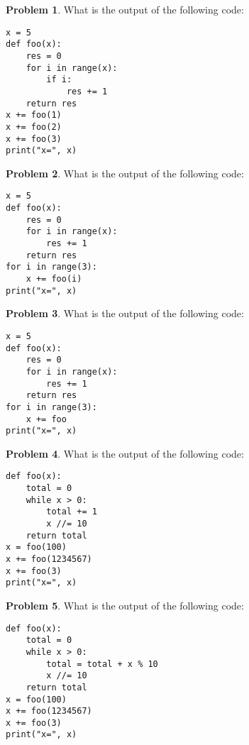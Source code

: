 \documentclass[10pt]{article}
\theoremstyle{definition}
\newtheorem{problem}{Problem}
\begin{document}
\newpage
\begin{problem}
    What is the output of the following code:
\end{problem}
\begin{lstlisting}
x = 5
def foo(x):
    res = 0
    for i in range(x):
        if i:
            res += 1
    return res
x += foo(1)
x += foo(2)
x += foo(3)
print("x=", x)
\end{lstlisting}
\vspace{2in}


\begin{problem}
    What is the output of the following code:
\end{problem}
\begin{lstlisting}
x = 5
def foo(x):
    res = 0
    for i in range(x):
        res += 1
    return res
for i in range(3):
    x += foo(i)
print("x=", x)
\end{lstlisting}
\vspace{2in}


\newpage
\begin{problem}
    What is the output of the following code:
\end{problem}
\begin{lstlisting}
x = 5
def foo(x):
    res = 0
    for i in range(x):
        res += 1
    return res
for i in range(3):
    x += foo
print("x=", x)
\end{lstlisting}
\vspace{2in}


\begin{problem}
    What is the output of the following code:
\end{problem}
\begin{lstlisting}
def foo(x):
    total = 0
    while x > 0:
        total += 1
        x //= 10
    return total
x = foo(100)
x += foo(1234567)
x += foo(3)
print("x=", x)
\end{lstlisting}
\vspace{2in}

\newpage
\begin{problem}
    What is the output of the following code:
\end{problem}
\begin{lstlisting}
def foo(x):
    total = 0
    while x > 0:
        total = total + x % 10
        x //= 10
    return total
x = foo(100)
x += foo(1234567)
x += foo(3)
print("x=", x)
\end{lstlisting}
\vspace{2in}
\end{document}
